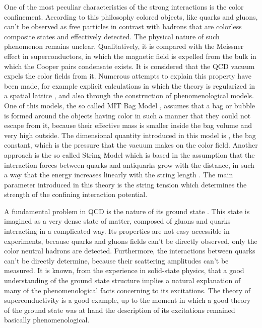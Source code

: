 \documentclass[12pt,letterpaper]{report}
\begin{document}
One of the most peculiar characteristics of the strong
interactions is the color confinement. According to this
philosophy colored objects, like quarks and gluons, can't be
observed as free particles in contrast with hadrons that are
colorless composite states and effectively detected. The physical
nature of such phenomenon remains unclear. Qualitatively, it is
compared with the Meissner effect in superconductors, in which the
magnetic field is expelled from the bulk in which the Cooper pairs
condensate exists. It is considered that the QCD vacuum expels the
color fields from it. Numerous attempts to explain this property
have been made, for example explicit calculations in which the
theory is regularized in a spatial lattice \cite{Creutz}, and also
through the construction of phenomenological models. One of this
models, the so called MIT Bag Model \cite{Chodos}, assumes that a
bag or bubble is formed around the objects having color in such a
manner that they could not escape from it, because their effective
mass is smaller inside the bag volume and very high outside. The
dimensional quantity introduced in this model is \coordHE{}, the bag
constant, which is the pressure that the vacuum makes on the color
field. Another approach is the so called String Model
\cite{Gervais} which is based in the assumption that the
interaction forces between quarks and antiquarks grow with the
distance, in such a way that the energy increases linearly with
the string length \coordHE{}. The main parameter introduced in this
theory is the string tension \coordHE{} which determines the strength of
the confining interaction potential.

A fundamental problem in QCD is the nature of its ground state
\cite{Shuryak}. This state is imagined as a very dense state of
matter, composed of gluons and quarks interacting in a complicated
way. Its properties are not easy accessible in experiments,
because quarks and gluons fields can't be directly observed, only
the color neutral hadrons are detected. Furthermore, the
interactions between quarks can't be directly determine, because
their scattering amplitudes can't be measured. It is known, from
the experience in solid-state physics, that a good understanding
of the ground state structure implies a natural explanation of
many of the phenomenological facts concerning to its excitations.
The theory of superconductivity is a good example, up to the
moment in which a good theory of the ground state was at hand the
description of its excitations remained basically
phenomenological.
\end{document}

